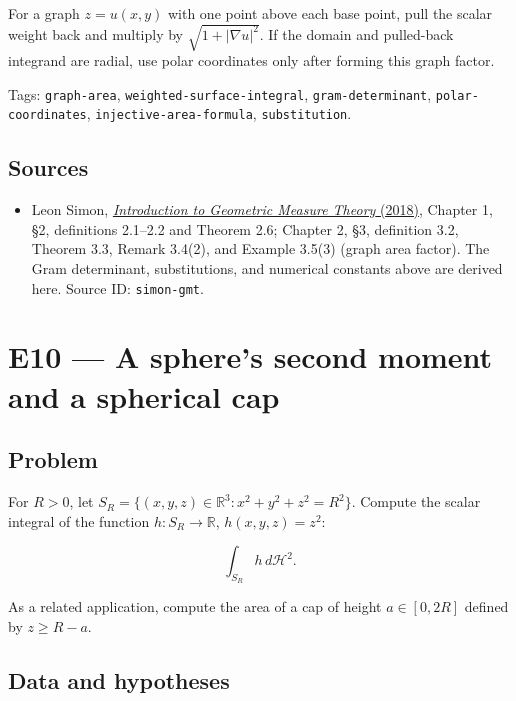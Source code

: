 \documentclass[
  11pt,
]{article}
\providecommand{\tightlist}{%
  \setlength{\itemsep}{0pt}\setlength{\parskip}{0pt}}
\begin{document}
For a graph \(z=u(x,y)\) with one point above each base point, pull the
scalar weight back and multiply by \(\sqrt{1+|\nabla u|^2}\). If the
domain and pulled-back integrand are radial, use polar coordinates only
after forming this graph factor.

\begingroup\small\raggedright Tags: \texttt{graph-\allowbreak{}area}, \texttt{weighted-\allowbreak{}surface-\allowbreak{}integral},
\texttt{gram-\allowbreak{}determinant}, \texttt{polar-\allowbreak{}coordinates},
\texttt{injective-\allowbreak{}area-\allowbreak{}formula}, \texttt{substitution}.\par\endgroup

\subsection{Sources}\label{sources-8}

\begin{itemize}
\tightlist
\item
  Leon Simon,
  \href{https://math.stanford.edu/~lms/ntu-gmt-text.pdf}{\emph{Introduction
  to Geometric Measure Theory} (2018)}, Chapter 1, §2, definitions
  2.1--2.2 and Theorem 2.6; Chapter 2, §3, definition 3.2, Theorem 3.3,
  Remark 3.4(2), and Example 3.5(3) (graph area factor). The Gram
  determinant, substitutions, and numerical constants above are derived
  here. Source ID: \texttt{simon-\allowbreak{}gmt}.
\end{itemize}

\section{E10 --- A sphere's second moment and a spherical
cap}\label{E10}

\subsection{Problem}\label{problem-9}

For \(R>0\), let \(S_R=\{(x,y,z)\in\mathbb R^3:x^2+y^2+z^2=R^2\}\).
Compute the scalar integral of the function \(h:S_R\to\mathbb R\),
\(h(x,y,z)=z^2\):

\[
\int_{S_R}h\,d\mathcal H^2.
\]

As a related application, compute the area of a cap of height
\(a\in[0,2R]\) defined by \(z\geq R-a\).

\subsection{Data and hypotheses}\label{data-and-hypotheses-9}
\end{document}
